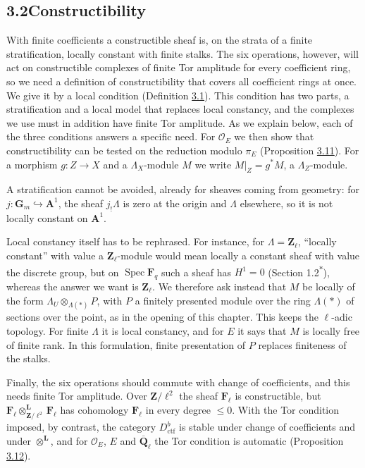 \documentclass[11pt]{article}
\newcommand{\bpout}[1]{#1\textsuperscript{\hyperlink{bp-outside}{\ensuremath{\ast}}}}
\begin{document}
\subsection*{\texorpdfstring{3.2\quad Constructibility}{3.2 Constructibility}}
\label{bp197}%
\label{bp198}%
With finite coefficients a constructible sheaf is, on the strata of a finite stratification, locally constant with finite stalks. The six operations, however, will act on constructible complexes of finite Tor amplitude for every coefficient ring, so we need a definition of constructibility that covers all coefficient rings at once. We give it by a local condition (Definition \hyperref[bp199]{3.1}). This condition has two parts, a stratification and a local model that replaces local constancy, and the complexes we use must in addition have finite Tor amplitude. As we explain below, each of the three conditions answers a specific need. For \(\mathcal O_E\) we then show that constructibility can be tested on the reduction modulo \(\pi_E\) (Proposition \hyperref[bp226]{3.11}). For a morphism \(g:Z\to X\) and a \(\Lambda_X\)-module \(M\) we write \(M|_Z=g^*M\), a \(\Lambda_Z\)-module.

A stratification cannot be avoided, already for sheaves coming from geometry: for \(j:\mathbf G_m\hookrightarrow\mathbf A^1\), the sheaf \(j_!\Lambda\) is zero at the origin and \(\Lambda\) elsewhere, so it is not locally constant on \(\mathbf A^1\).

Local constancy itself has to be rephrased. For instance, for \(\Lambda=\mathbf Z_\ell\), “locally constant” with value a \(\mathbf Z_\ell\)-module would mean locally a constant sheaf with value the discrete group, but on \(\operatorname{Spec}\mathbf F_q\) such a sheaf has \(H^1=0\) (Section \bpout{1.2}), whereas the answer we want is \(\mathbf Z_\ell\). We therefore ask instead that \(M\) be locally of the form \(\Lambda_U\otimes_{\Lambda(*)}P\), with \(P\) a finitely presented module over the ring \(\Lambda(*)\) of sections over the point, as in the opening of this chapter. This keeps the \(\ell\)-adic topology. For finite \(\Lambda\) it is local constancy, and for \(E\) it says that \(M\) is locally free of finite rank. In this formulation, finite presentation of \(P\) replaces finiteness of the stalks.

Finally, the six operations should commute with change of coefficients, and this needs finite Tor amplitude. Over \(\mathbf Z/\ell^2\) the sheaf \(\mathbf F_\ell\) is constructible, but \(\mathbf F_\ell\otimes^{\mathbf L}_{\mathbf Z/\ell^2}\mathbf F_\ell\) has cohomology \(\mathbf F_\ell\) in every degree \(\leq0\). With the Tor condition imposed, by contrast, the category \(D^b_{\mathrm{ctf}}\) is stable under change of coefficients and under \(\otimes^{\mathbf L}\), and for \(\mathcal O_E\), \(E\) and \(\overline{\mathbf Q}_\ell\) the Tor condition is automatic (Proposition \hyperref[bp232]{3.12}).
\end{document}
